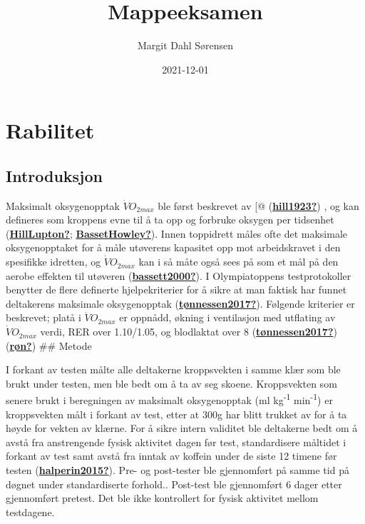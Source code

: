 \documentclass[
]{book}
\title{Mappeeksamen}
\author{Margit Dahl Sørensen}
\date{2021-12-01}
\begin{document}
\frontmatter
\maketitle

\mainmatter
\hypertarget{rabilitet}{%
\chapter{Rabilitet}\label{rabilitet}}

\hypertarget{introduksjon}{%
\section{Introduksjon}\label{introduksjon}}

Maksimalt oksygenopptak \(\dot VO_{2max}\) ble først beskrevet av {[}@
(\protect\hyperlink{ref-hill1923}{\textbf{hill1923?}}) , og kan
defineres som kroppens evne til å ta opp og forbruke oksygen per
tidsenhet (\protect\hyperlink{ref-HillLupton}{\textbf{HillLupton?}};
\protect\hyperlink{ref-BassetHowley}{\textbf{BassetHowley?}}). Innen
toppidrett måles ofte det maksimale oksygenopptaket for å måle utøverens
kapasitet opp mot arbeidskravet i den spesifikke idretten, og
\(\dot VO_{2max}\) kan i så måte også sees på som et mål på den aerobe
effekten til utøveren
(\protect\hyperlink{ref-bassett2000}{\textbf{bassett2000?}}). I
Olympiatoppens testprotokoller benytter de flere definerte
hjelpekriterier for å sikre at man faktisk har funnet deltakerens
maksimale oksygenopptak
(\protect\hyperlink{ref-tuxf8nnessen2017}{\textbf{tønnessen2017?}}).
Følgende kriterier er beskrevet; platå i \(\dot VO_{2max}\) er oppnådd,
økning i ventilasjon med utflating av \(\dot VO_{2max}\) verdi, RER over
1.10/1.05, og blodlaktat over 8
(\protect\hyperlink{ref-tuxf8nnessen2017}{\textbf{tønnessen2017?}})
(\protect\hyperlink{ref-ruxf8n}{\textbf{røn?}}) \#\# Metode

I forkant av testen målte alle deltakerne kroppsvekten i samme klær som
ble brukt under testen, men ble bedt om å ta av seg skoene. Kroppsvekten
som senere brukt i beregningen av maksimalt oksygenopptak (ml
kg\textsuperscript{-1} min\textsuperscript{-1}) er kroppsvekten målt i
forkant av test, etter at 300g har blitt trukket av for å ta høyde for
vekten av klærne. For å sikre intern validitet ble deltakerne bedt om å
avstå fra anstrengende fysisk aktivitet dagen før test, standardisere
måltidet i forkant av test samt avstå fra inntak av koffein under de
siste 12 timene før testen
(\protect\hyperlink{ref-halperin2015}{\textbf{halperin2015?}}). Pre- og
post-tester ble gjennomført på samme tid på døgnet under standardiserte
forhold.. Post-test ble gjennomført 6 dager etter gjennomført pretest.
Det ble ikke kontrollert for fysisk aktivitet mellom testdagene.
\end{document}
